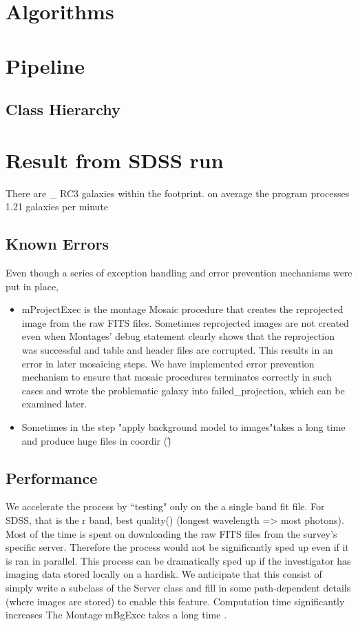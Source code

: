 \documentclass[5p]{elsarticle}
\begin{document}
\section{Algorithms}
\section{Pipeline}
	\subsection{Class Hierarchy}
\section{Result from SDSS run}
There are \_ RC3 galaxies within the footprint. 
on average the program processes 1.21 galaxies per minute
	\subsection{Known Errors}
		
	Even though a series of exception handling and error prevention mechanisms were put in place, 
	 	\begin{itemize}
	 		\item mProjectExec is the montage Mosaic procedure that creates the reprojected image from the raw FITS files. Sometimes reprojected images are not created even when Montages' debug statement clearly shows that the reprojection was successful and table and header files are corrupted. This results in an error in later mosaicing steps. We have implemented error prevention mechanism to ensure that mosaic procedures terminates correctly in such cases and wrote the problematic galaxy into failed\_projection, which can be examined later.
	 		\item Sometimes in the step "apply background model to images"takes a long time and produce huge files in coordir (\~)
	 	\end{itemize}
	
	\subsection{Performance}
	We accelerate the process by ``testing" only on the a single band fit file. For SDSS, that is the r band, best quality(\cite{photopaper}) (longest wavelength => most photons).  Most of the time is spent on downloading the raw FITS files from the survey's specific server. Therefore the process would not be significantly sped up even if it is ran in parallel. This process can be dramatically sped up if the investigator has imaging data stored locally on a hardisk. We anticipate that this consist of simply write a subclass of the Server class and fill in some path-dependent details (where images are stored) to enable this feature.
	Computation time significantly increases 
The Montage 	mBgExec takes a long time . 
\end{document}
